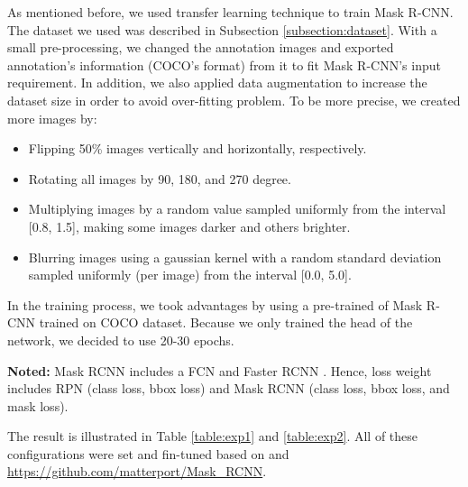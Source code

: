 	As mentioned before, we used transfer learning technique to train Mask R-CNN. The dataset we used was described in Subsection \ref{subsection:dataset}. With a small pre-processing, we changed the annotation images and exported annotation's information (COCO's format) from it to fit Mask R-CNN's input requirement. In addition, we also applied data augmentation to increase the dataset size in order to avoid over-fitting problem. To be more precise, we created more images by:
	
	\begin{itemize}
		\item Flipping 50\% images vertically and horizontally, respectively.
		\item Rotating all images by 90, 180, and 270 degree.
		\item Multiplying images by a random value sampled uniformly from the interval [0.8, 1.5], making some images darker and others brighter.
		\item Blurring images using a gaussian kernel with a random standard deviation sampled uniformly (per image) from the interval [0.0, 5.0].
	\end{itemize}
	
	In the training process, we took advantages by using a pre-trained of Mask R-CNN trained on COCO dataset. Because we only trained the head of the network, we decided to use 20-30 epochs.
	
	\textbf{Noted:} Mask RCNN includes a FCN \cite{fcn} and Faster RCNN \cite{f}. Hence, loss weight includes RPN (class loss, bbox loss) and Mask RCNN (class loss, bbox loss, and mask loss).
	
	The result is illustrated in Table \ref{table:exp1} and \ref{table:exp2}. All of these configurations were set and fin-tuned based on \cite{maskrcnn} and \url{https://github.com/matterport/Mask_RCNN}.
	

